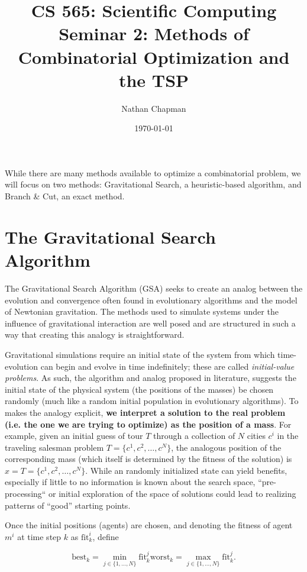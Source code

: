 \documentclass{article}
\title{\vspace*{-0.625in}CS 565: Scientific Computing \\ Seminar 2: Methods of Combinatorial Optimization and the TSP}
\author{Nathan Chapman}
\date{\today}
\begin{document}
    \maketitle

        While there are many methods available to optimize a combinatorial problem, we will focus on two methods: Gravitational Search, a heuristic-based algorithm, and Branch \& Cut, an exact method.

        \section*{The Gravitational Search Algorithm}

            The Gravitational Search Algorithm (GSA) seeks to create an analog between the evolution and convergence often found in evolutionary algorithms and the model of Newtonian gravitation.  The methods used to simulate systems under the influence of gravitational interaction are well posed and are structured in such a way that creating this analogy is straightforward.
            
            Gravitational simulations require an initial state of the system from which time-evolution can begin and evolve in time indefinitely; these are called \emph{initial-value problems}.  As such, the algorithm and analog proposed in literature\cite{GSA}, suggests the initial state of the physical system (the positions of the masses) be chosen randomly (much like a random initial population in evolutionary algorithms).  To makes the analogy explicit, \textbf{we interpret a solution to the real problem (i.e. the one we are trying to optimize) as the position of a mass}.  For example, given an initial guess of tour $T$ through a collection of $N$ cities $c^i$ in the traveling salesman problem $T = \{c^1, c^2, \ldots, c^N\}$, the analogous position of the corresponding mass (which itself is determined by the fitness of the solution) is $x = T = \{c^1, c^2, \ldots, c^N\}$.  While an randomly initialized state can yield benefits, especially if little to no information is known about the search space, ``pre-processing`` or initial exploration of the space of solutions could lead to realizing patterns of ``good'' starting points.

            Once the initial positions (agents) are chosen, and denoting the fitness of agent $m^i$ at time step $k$ as $\mathrm{fit}_k^i$, define

            \begin{subequations}
                \begin{equation}
                    \mathrm{best}_k = \min_{j \in \{1, \ldots, N\}} \mathrm{fit}_k^j
                \end{equation}
                \begin{equation}
                    \mathrm{worst}_k = \max_{j \in \{1, \ldots, N\}} \mathrm{fit}_k^j.
                \end{equation}
            \end{subequations}
\end{document}
